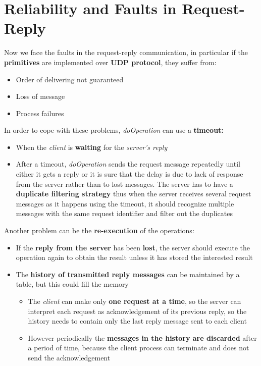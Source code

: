 \section{Reliability and Faults in Request-Reply}
Now we face the faults in the request-reply communication, in particular if the \textbf{primitives} are implemented over \textbf{UDP protocol}, they suffer from:
\begin{itemize}
    \item Order of delivering not guaranteed
    \item Loss of message
    \item Process failures
\end{itemize}
In order to cope with these problems, \textit{doOperation} can use a \textbf{timeout:}
\begin{itemize}
    \item When the \textit{client} is \textbf{waiting} for the \textit{server’s reply}
    \item After a timeout, \textit{doOperation} sends the request message repeatedly until either it gets a reply or it is sure that the delay is due to lack of response from the server rather than to lost messages.
    The server has to have a \textbf{duplicate filtering strategy} thus when the server receives several request messages as it happens using the timeout, it should recognize multiple messages with the same request identifier and filter out the duplicates
\end{itemize}
Another problem can be the \textbf{re-execution} of the operations:
\begin{itemize}
    \item If the \textbf{reply from the server} has been \textbf{lost}, the server should execute the operation again to obtain the result unless it has stored the interested result
    \item The \textbf{history of transmitted reply messages} can be maintained by a table, but this could fill the memory
        \begin{itemize}
            \item The \textit{client} can make only \textbf{one request at a time}, so the server can interpret each request as acknowledgement of its previous reply, so the history needs to contain only the last reply message sent to each client
            \item However periodically the \textbf{messages in the history are discarded} after a period of time, because the client process can terminate and does not send the acknowledgement
        \end{itemize}
\end{itemize}

